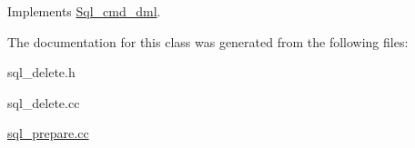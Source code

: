 Implements \mbox{\hyperlink{classSql__cmd__dml_af36dc69e855d0e48d0e79002576907a4}{Sql\+\_\+cmd\+\_\+dml}}.



The documentation for this class was generated from the following files\+:\begin{DoxyCompactItemize}
\item 
sql\+\_\+delete.\+h\item 
sql\+\_\+delete.\+cc\item 
\mbox{\hyperlink{sql__prepare_8cc}{sql\+\_\+prepare.\+cc}}\end{DoxyCompactItemize}

